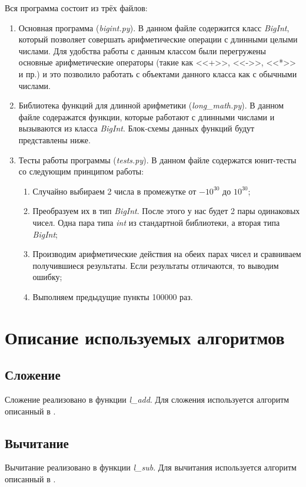 Вся программа состоит из трёх файлов:
\begin{enumerate}
    \item Основная программа (\textit{bigint.py}). В данном файле содержится класс \textit{BigInt},
    который позволяет совершать арифметические операции с длинными целыми числами. Для удобства работы
    с данным классом были перегружены основные арифметические операторы (такие как <<+>>, <<->>, <<*>> и пр.)
    и это позволило работать с объектами данного класса как с обычными числами.
    \item Библиотека функций для длинной арифметики (\textit{long\_math.py}). В данном файле содеражатся
    функции, которые работают с длинными числами и вызываются из класса \textit{BigInt}. Блок-схемы данных
    функций будут представлены ниже.
    \item Тесты работы программы (\textit{tests.py}). В данном файле содержатся юнит-тесты со следующим принципом работы:
    \begin{enumerate}
        \item Случайно выбираем 2 числа в промежутке от $-10^{30}$ до $10^{30}$;
        \item Преобразуем их в тип \textit{BigInt}. После этого у нас будет 2 пары одинаковых чисел. Одна пара типа
        \textit{int} из стандартной библиотеки, а вторая типа \textit{BigInt};
        \item Производим арифметические действия на обеих парах чисел и сравниваем получившиеся результаты.
        Если результаты отличаются, то выводим ошибку;
        \item Выполняем предыдущие пункты 100000 раз.
    \end{enumerate}
\end{enumerate}

\clearpage

\section{Описание используемых алгоритмов}

\subsection{Сложение}
Сложение реализовано в функции \textit{l\_add}. Для сложения используется алгоритм описанный в \cite{zavg}.

\subsection{Вычитание}
Вычитание реализовано в функции \textit{l\_sub}. Для вычитания используется алгоритм описанный в \cite{zavg}.

